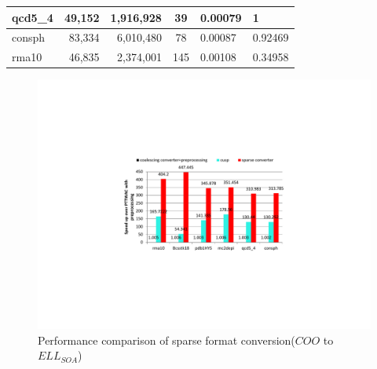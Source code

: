 \documentclass[10pt,journal,compsoc]{IEEEtran}
\begin{document}
\begin{table}[]
\begin{tabular}{lrrcll}
qcd5\_4                     & 49,152                                                                 & 1,916,928                                                                                & 39                                                               & 0.00079                                                                    & 1                                                                        \\ \hline
consph                      & 83,334                                                                 & 6,010,480                                                                                & 78                                                               & 0.00087                                                                    & 0.92469                                                                  \\ \hline
rma10                       & 46,835                                                                 & 2,374,001                                                                                & 145                                                              & 0.00108                                                                    & 0.34958                                                                  \\ \hline
\end{tabular}
\end{table}


 \begin{figure}[tb]
 \begin{center}
 \graphicspath{{picture/}}
 \includegraphics[scale=0.6]{sparse_COOtoELL_total}
 \caption{Performance comparison of sparse format conversion($ COO $ to $ ELL_{SOA} $) }
 \label{fig:sparse_total_performance}
 \end{center}
 \end{figure}
\end{document}
